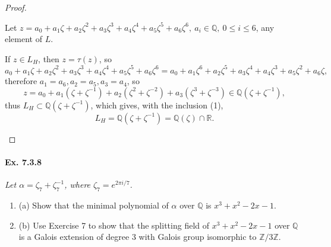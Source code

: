 \documentclass[11pt,a4paper]{article}
\newcommand{\be} {\begin{enumerate}}
\newcommand{\ee} {\end{enumerate}}
\newcommand{\Q}{\mathbb{Q}}
\newcommand{\Z}{\mathbb{Z}}
\newcommand{\R}{\mathbb{R}}
\begin{document}
\begin{proof}
\begin{enumerate}
Let $z = a_0 + a_1\zeta+a_2\zeta^2+a_3\zeta^3+a_4\zeta^4+a_5\zeta^5+a_6\zeta^6, \ a_i \in \Q,\ 0\leq i \leq 6$, any element of $L$.

If $z \in L_H$, then $z= \tau(z) $, so $$a_0 + a_1\zeta+a_2\zeta^2+a_3\zeta^3+a_4\zeta^4+a_5\zeta^5+a_6\zeta^6=
a_0 +a_1\zeta^6+a_2\zeta^5+a_3\zeta^4+a_4\zeta^3+a_5\zeta^2+a_6\zeta,$$ therefore $a_1 = a_6,a_2=a_5,a_3=a_4$, so
$$z = a_0 + a_1(\zeta+\zeta^{-1})+a_2(\zeta^2+\zeta^{-2}) + a_3(\zeta^3+\zeta^{-3}) \in \Q(\zeta+\zeta^{-1}),$$
thus $L_H \subset \Q(\zeta + \zeta^{-1})$, which gives, with the inclusion (1),
$$L_H = \Q(\zeta + \zeta^{-1}) = \Q(\zeta) \cap \R.$$
\end{enumerate}
\end{proof}

\paragraph{Ex. 7.3.8}

{\it Let $\alpha = \zeta_7 + \zeta_7^{-1}$, where $\zeta_7 = e^{2 \pi i/7}$.
\be
\item[(a)] Show that the minimal polynomial of $\alpha$ over $\Q$ is $x^3+x^2-2x-1$.
\item[(b)] Use Exercise 7 to show that the splitting field of $x^3+x^2-2x-1$ over $\Q$ is a Galois extension of degree 3 with Galois group isomorphic to $\Z/3\Z$.
\ee
}
\end{document}
